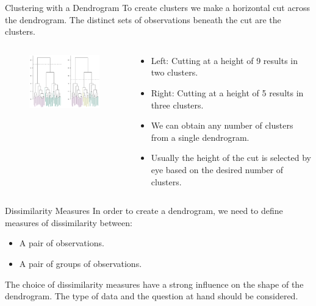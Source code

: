 \documentclass[
  ignorenonframetext,
  aspectratio=169,
]{beamer}
\begin{document}
\begin{frame}{Clustering with a Dendrogram}
\protect\hypertarget{clustering-with-a-dendrogram}{}
\alert{To create clusters we make a horizontal cut across the dendrogram. The distinct sets of observations beneath the cut are the clusters.}

\begin{columns}[T]
\begin{column}{0.5\textwidth}
\begin{figure}

{\centering \includegraphics[width=3.125in,height=\textheight]{images/hierarchical_cluster.png}

}

\end{figure}
\end{column}

\begin{column}{0.5\textwidth}
\begin{itemize}
\item
  Left: Cutting at a height of 9 results in two clusters.
\item
  Right: Cutting at a height of 5 results in three clusters.
\item
  We can obtain any number of clusters from a single dendrogram.
\item
  Usually the height of the cut is selected by eye based on the desired
  number of clusters.
\end{itemize}
\end{column}
\end{columns}
\end{frame}

\begin{frame}{Dissimilarity Measures}
\protect\hypertarget{dissimilarity-measures}{}
In order to create a dendrogram, we need to define measures of
dissimilarity between:

\begin{itemize}
\item
  A pair of observations.
\item
  A pair of groups of observations.
\end{itemize}

The choice of dissimilarity measures have a strong influence on the
shape of the dendrogram. The type of data and the question at hand
should be considered.
\end{frame}
\end{document}
